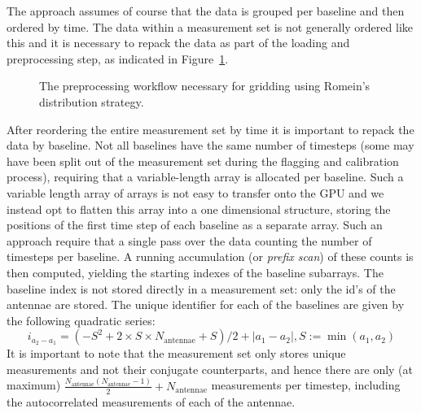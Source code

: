 The approach assumes of course that the data is grouped per baseline and then ordered by time.
The data within a measurement set is not generally ordered like this and it is necessary to repack the 
data as part of the loading and preprocessing step, as indicated in Figure~\ref{fig_gpu_preprocess}.
\begin{figure}[ht!]
 \begin{mdframed}
 \centering
 \caption[GPU preprocessing workflow]{The preprocessing workflow necessary for gridding using
 Romein's distribution strategy.}
 \label{fig_gpu_preprocess}
 \end{mdframed}
\end{figure}

After reordering the entire measurement set by time it is important to repack the data by baseline. 
Not all baselines have the same number of timesteps (some may have been split out of the measurement 
set during the flagging and calibration process), requiring that a variable-length array is allocated
per baseline. Such a variable length array of arrays is not easy to transfer onto the GPU and we instead
opt to flatten this array into a one dimensional structure, storing the positions of the first time step
of each baseline as a separate array. Such an approach require that a single pass over the data counting 
the number of timesteps per baseline. A running accumulation (or \textit{prefix scan}) of these counts
is then computed, yielding the starting indexes of the baseline subarrays. The baseline index is not
stored directly in a measurement set: only the id's of the antennae are stored. The unique identifier
for each of the baselines are given by the following quadratic series:
\begin{equation}
 i_{a_2-a_1} = (-S^2 + 2\times S\times N_\text{antennae} + S) / 2 + |a_1 - a_2|, S := \min(a_1,a_2)
\end{equation}
It is important to note that the measurement set only stores unique measurements and not their conjugate 
counterparts, and hence there are only (at maximum) $\frac{N_\text{antennae}(N_\text{antennae} - 1)}{2} + N_\text{antennae}$
measurements per timestep, including the autocorrelated measurements of each of the antennae.

